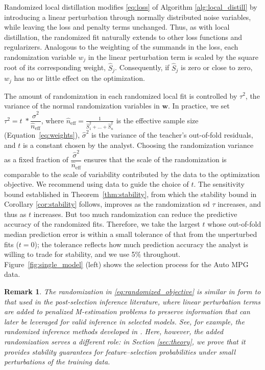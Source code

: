 \documentclass[12pt]{article}
\newtheorem{remark}{Remark}
\theoremstyle{definition}
\begin{document}
Randomized local distillation modifies \eqref{eq:loss} of Algorithm \ref{alg:local_distill} by introducing a linear perturbation through normally distributed noise variables, while leaving the loss and penalty terms unchanged.
Thus, as with local distillation, the randomized fit naturally extends to other loss functions and regularizers.
Analogous to the weighting of the summands in the loss, each randomization variable $w_j$ in the linear perturbation term is scaled by the square root of its corresponding weight, $\hat{S}_j$.
Consequently, if $\hat{S}_j$ is zero or close to zero, $w_j$ has no or little effect on the optimization.

The amount of randomization in each randomized local fit is controlled by $\tau^2$, the variance of the normal randomization variables in $\bm w$.
In practice, we set $\tau^2= t \; *\dfrac{\hat{\sigma}^2}{\hat{n}_{\text{eff}}}$, where $\hat{n}_{\text{eff}} = \frac{1}{\hat{S}_1^2 + \ldots + \hat{S}_n^2}$ is the effective sample size  (Equation~\eqref{eq:weights}), $\hat{\sigma}^2$ is the variance of the teacher’s out-of-fold residuals, and $t$ is a constant chosen by the analyst. 
Choosing the randomization variance as a fixed fraction of $\dfrac{\hat{\sigma}^2}{\hat{n}_{\text{eff}}}$ ensures that the scale of the randomization is comparable to the scale of variability contributed by the data to the optimization objective.
We recommend using data to guide the choice of $t$.
The sensitivity bound established in Theorem~\ref{thm:stability}, from which the stability bound in Corollary \ref{cor:stability} follows, improves as the randomization sd $\tau$ increases, and thus as $t$ increases.
But too much randomization can reduce the predictive accuracy of the randomized fits.
Therefore, we take the largest $t$ whose out-of-fold median prediction error is within a small tolerance of that from the unperturbed fits ($t=0$); the tolerance reflects how much prediction accuracy the analyst is willing to trade for stability, and we use 5\% throughout.
Figure~\ref{fig:single_model} (left) shows the selection process for the Auto MPG data.

{\small{
\begin{remark}
The randomization in \eqref{eq:randomized_objective} is similar in form to that used in the post-selection inference literature, where linear perturbation terms are added to penalized M-estimation problems to preserve information that can later be leveraged for valid inference in selected models.
See, for example, the randomized inference methods developed in \cite{tian2018randomized, panigrahi2021selection, bakshi2024selective, huang2025selective, perry2026post}.
Here, however, the added randomization serves a different role: in Section \ref{sec:theory}, we prove that it provides stability guarantees for feature--selection probabilities under small perturbations of the training data.
\end{remark}
}}
\end{document}
